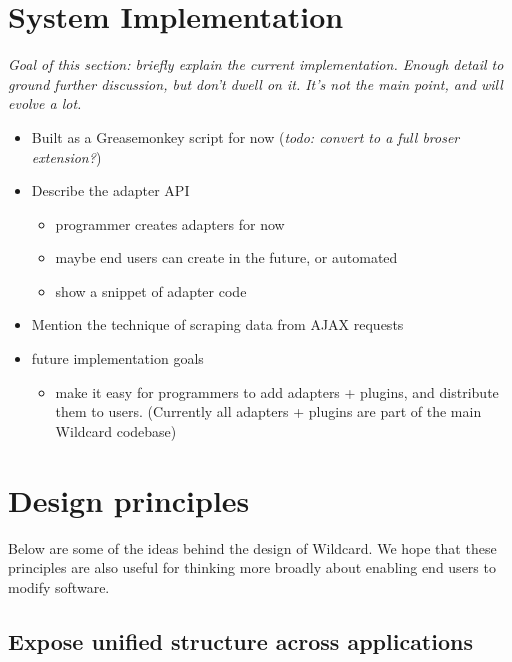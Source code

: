 \documentclass[english,submission]{programming}
\providecommand{\tightlist}{%
  \setlength{\itemsep}{0pt}\setlength{\parskip}{0pt}}
\begin{document}
\hypertarget{system-implementation}{%
\section{System Implementation}\label{system-implementation}}

\emph{Goal of this section: briefly explain the current implementation.
Enough detail to ground further discussion, but don't dwell on it. It's
not the main point, and will evolve a lot.}

\begin{itemize}
\tightlist
\item
  Built as a Greasemonkey script for now (\emph{todo: convert to a full
  broser extension?})
\item
  Describe the adapter API

  \begin{itemize}
  \tightlist
  \item
    programmer creates adapters for now
  \item
    maybe end users can create in the future, or automated
  \item
    show a snippet of adapter code
  \end{itemize}
\item
  Mention the technique of scraping data from AJAX requests
\item
  future implementation goals

  \begin{itemize}
  \tightlist
  \item
    make it easy for programmers to add adapters + plugins, and
    distribute them to users. (Currently all adapters + plugins are part
    of the main Wildcard codebase)
  \end{itemize}
\end{itemize}

\hypertarget{design-principles}{%
\section{Design principles}\label{design-principles}}

Below are some of the ideas behind the design of Wildcard. We hope that
these principles are also useful for thinking more broadly about
enabling end users to modify software.

\hypertarget{expose-unified-structure-across-applications}{%
\subsection{Expose unified structure across
applications}\label{expose-unified-structure-across-applications}}
\end{document}
